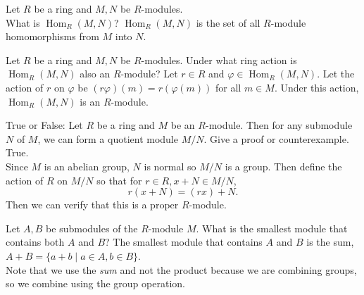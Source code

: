 \documentclass[avery5371,grid]{flashcards}
\newcommand{\rmod}{$R$-module}
\DeclareMathOperator{\Hom}{Hom}
\let \phi \varphi
\begin{document}


\begin{flashcard}[Modules]{Let $R$ be a ring and $M,N$ be $R$-modules.\\ What is $\Hom_R(M,N)$?}
 $\Hom_R(M,N)$ is the set of all $R$-module homomorphisms from $M$ into $N$.
\end{flashcard}

\begin{flashcard}[Modules]{Let $R$ be a ring and $M,N$ be $R$-modules. Under what ring action is $\Hom_R(M,N)$ also an $R$-module?}
 Let $r \in R$ and $\phi \in \Hom_R(M,N)$. Let the action of $r$ on $\phi$ be $(r \phi)(m) = r(\phi(m))$ for all $m \in M$. Under this action, $\Hom_R(M,N)$ is an $R$-module.
\end{flashcard}


\begin{flashcard}[Modules]{True or False: Let $R$ be a ring and $M$ be an $R$-module. Then for any submodule $N$ of $M$, we can form a quotient module $M/N$. Give a proof or counterexample.}
 True.\\
 
 Since $M$ is an abelian group, $N$ is normal so $M/N$ is a group. Then define the action of $R$ on $M/N$ so that for $r \in R, x+N \in M/N$,
 $$
 r(x+N) = (rx) + N.
 $$
 Then we can verify that this is a proper $R$-module.
\end{flashcard}

\begin{flashcard}[Modules]{Let $A,B$ be submodules of the $R$-module $M$. What is the smallest module that contains both $A$ and $B$? }
 The smallest module that contains $A$ and $B$ is the sum, $A+B = \{a+b \mid a \in A, b \in B \}$.\\
 
 Note that we use the \emph{sum} and not the product because we are combining groups, so we combine using the group operation.
\end{flashcard}
\end{document}
